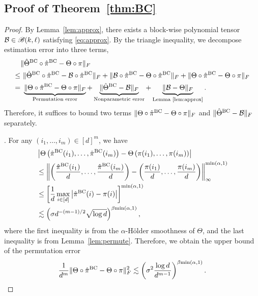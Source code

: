 \documentclass[11pt]{article}
\theoremstyle{definition}
\def\caliB{\mathscr{B}}
\begin{document}
\subsection{Proof of Theorem~\ref{thm:BC}}
\begin{proof}
By Lemma~\ref{lem:approx}, there exists a block-wise polynomial tensor $\tB\in\caliB(k,\ell)$ satisfying \eqref{eq:approx}.
By the triangle inequality,
we decompose estimation error into three terms,
\begin{align}\label{eq:3decomp}
    &\FnormSize{}{\hat\Theta^{\text{BC}}\circ \hat\pi^{\text{BC}}-\Theta\circ\pi}\\
    \leq&\ \FnormSize{}{\hat\Theta^{\text{BC}}\circ \hat\pi^{\text{BC}}-\tB\circ\hat\pi^{\text{BC}}}+\FnormSize{}{\tB\circ\hat\pi^{\text{BC}}-\Theta\circ\hat\pi^{\text{BC}}}+\FnormSize{}{\Theta\circ\hat\pi^{\text{BC}}-\Theta\circ\pi}\nonumber\\
    =&\ \underbrace{\FnormSize{}{\Theta\circ\hat\pi^{\text{BC}}-\Theta\circ\pi}}_{\textup{Permutation error}}+\underbrace{\FnormSize{}{\hat\Theta^{\text{BC}}-\tB}}_{\textup{Nonparametric error}}+\underbrace{\FnormSize{}{\tB-\Theta}}_{\textup{Lemma~\ref{lem:approx}}}.
\end{align}
Therefore, it suffices to bound two terms $\lVert\Theta\circ\hat\pi^{\text{BC}}-\Theta\circ\pi\rVert_F$ and $\lVert\hat\Theta^{\text{BC}}-\mathcal{B}\rVert_F$ separately. 

.
    For any $(i_1,\ldots,i_m)\in[d]^m$, we have 
    \begin{align}
        &\left|\Theta\left(\hat\pi^{\textup{BC}}(i_1),\ldots,\hat\pi^{\textup{BC}}(i_m)\right)-\Theta\left(\pi(i_1),\ldots,\pi(i_m)\right)\right|\\&\leq \left\|\left(\frac{\hat\pi^{\textup{BC}}(i_1)}{d},\ldots,\frac{\hat\pi^{\textup{BC}}(i_m)}{d}\right)-\left(\frac{\pi(i_1)}{d},\ldots,\frac{\pi(i_m)}{d}\right)\right\|_\infty^{\min(\alpha,1)}\\&\leq \left[\frac{1}{d}\max_{i\in[d]}\left|\hat\pi^{\textup{BC}}(i)-\pi(i)\right|\right]^{\min(\alpha,1)}\\&\lesssim \left(\sigma d^{-(m-1)/2}\sqrt{\log d}\right)^{\beta{\min(\alpha,1)}},
    \end{align}
    where the first inequality is from the $\alpha$-H\"older smoothness of $\Theta$, and the last inequality is from Lemma~\ref{lem:permute}. Therefore, we obtain the upper bound of the permutation error 
    \begin{align}\label{eq:permerror}
        \frac{1}{d^m}\lVert\Theta\circ\hat\pi^{\text{BC}}-\Theta\circ\pi\rVert_F^2\lesssim \left(\sigma^2 \frac{\log d}{d^{m-1}}\right)^{\beta{\min(\alpha,1)}}.
    \end{align}
    

\end{proof}
\end{document}
